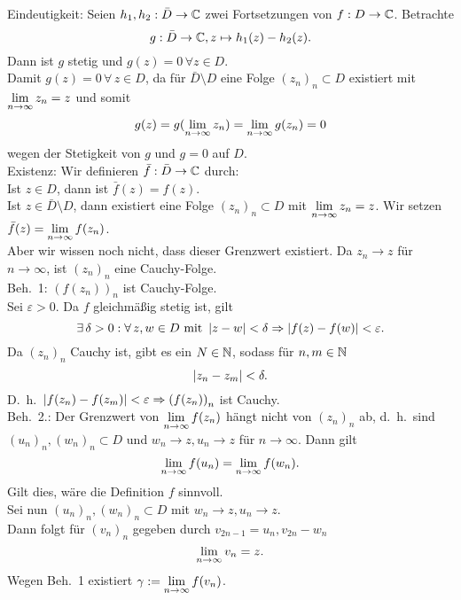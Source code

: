\documentclass[../ana1.tex]{subfiles}
\begin{document}
\begin{bew}
    Eindeutigkeit: Seien \( h_1,h_2 : \bar{D} 
    \rightarrow \mathbb{C} \) zwei Fortsetzungen von 
    \( f : D \rightarrow \mathbb{C} \). Betrachte 
    \[ g: \bar{D} \rightarrow \mathbb{C}, z \mapsto 
    h_1(z) - h_2(z). \]
    Dann ist \(g\) stetig und \( g(z) = 0 
    \, \forall z\in D \).\\
    Damit \( g(z) = 0 \,\forall \, z \in D \), da für 
    \( \bar{D} \setminus D \) eine Folge 
    \( {(z_n)}_n \subset D \) existiert mit 
    \( \lim\limits_{n\rightarrow\infty} z_n = z \) und somit 
    \[ g(z) = g(\lim\limits_{n\rightarrow\infty} z_n) = \lim\limits_{n\rightarrow\infty} g(z_n) = 0 \]
    wegen der Stetigkeit von \(g\) und \( g=0 \) auf \(D\).\\
    Existenz: Wir definieren \( \bar{f}: \bar{D} 
    \rightarrow \mathbb{C} \) durch:\\
    Ist \( z\in D \), dann ist \( \bar{f}(z) = f(z) \).\\
    Ist \( z\in \bar{D}\setminus D \), dann existiert
    eine Folge \( {(z_n)}_n \subset D \) mit 
    \( \lim\limits_{n\rightarrow\infty} z_n = z \). Wir setzen \( \bar{f}(z) 
    = \lim\limits_{n\rightarrow\infty} f(z_n) \).\\
    Aber wir wissen noch nicht, dass dieser Grenzwert 
    existiert. Da \(z_n \rightarrow z\) für 
    \(n\rightarrow \infty \), ist \( {(z_n)}_n \) eine 
    Cauchy-Folge.\\
    Beh.\ 1: \( {(f(z_n))}_n \) ist Cauchy-Folge.\\
    Sei \( \varepsilon > 0 \). Da \(f\) gleichmäßig stetig 
    ist, gilt 
    \[ \exists\, \delta > 0 : \forall \, z, w \in D 
    \text{ mit } \left|z-w\right| < \delta \Rightarrow 
    \left|f(z) - f(w)\right| < \varepsilon. \]
    Da \( {(z_n)}_n \) Cauchy ist, gibt es ein \( N\in\mathbb{N} \), 
    sodass für \( n,m\in\mathbb{N} \)
    \[ \left|z_n - z_m\right| < \delta. \]
    D.\ h.\  \( \left|f(z_n) - f(z_m)\right| < \varepsilon 
    \Rightarrow {(f(z_n))}_n \) ist Cauchy.\\
    Beh.\ 2.: Der Grenzwert von \( \lim\limits_{n\rightarrow\infty} f(z_n) \)
    hängt nicht von \( {(z_n)}_n \) ab, d.\ h.\ sind 
    \( {(u_n)}_n, {(w_n)}_n \subset D \) und 
    \( w_n \rightarrow z, u_n \rightarrow z \) für 
    \(n\rightarrow \infty \). Dann gilt 
    \[ \lim\limits_{n\rightarrow\infty} f(u_n) = \lim\limits_{n\rightarrow\infty} f(w_n). \]
    Gilt dies, wäre die Definition \(f\) sinnvoll.\\
    Sei nun \( {(u_n)}_n, {(w_n)}_n \subset D \) mit 
    \( w_n \rightarrow z, u_n \rightarrow z \). \\
    Dann folgt für \( {(v_n)}_n \) gegeben durch 
    \( v_{2n-1} = u_n, v_{2n} - w_n \)
    \[ \lim\limits_{n\rightarrow\infty} v_n = z. \]
    Wegen Beh.\ 1 existiert \( \gamma := \lim\limits_{n\rightarrow\infty} f(v_n) \).\\

\end{bew}
\end{document}
